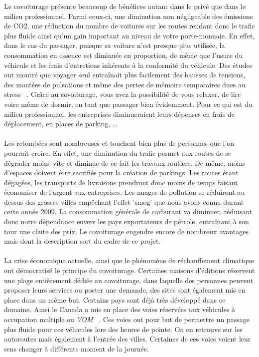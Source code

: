 \documentclass[12pt, a4paper, oneside]{article}
\begin{document}
    \indent Le covoiturage présente beaucoup de bénéfices autant dans le privé que dans le milieu professionnel. Parmi ceux-ci, une diminution non négligeable des émissions de CO2, une réduction du nombre de voitures sur les routes rendant donc le trafic plus fluide ainsi qu'un gain important au niveau de votre porte-monnaie. En effet, dans le cas du passager, puisque sa voiture n'est presque plus utilisée, la consommation en essence est diminuée en proportion, de même que l'usure du véhicule et les frais d'entretiens inhérents à la conformité du véhicule. Des études ont montré que voyager seul entraînait plus facilement des hausses de tensions, des montées de pulsations et même des pertes de mémoire temporaires dues au stress ~\cite{health-study}. Grâce au covoiturage, vous avez la possibilité de vous relaxer, de lire voire même de dormir, en tant que passager bien évidemment. Pour ce qui est du milieu professionnel, les entreprises diminueraient leurs dépenses en frais de déplacement, en places de parking, \dots\\\\
    \indent Les retombées sont nombreuses et touchent bien plus de personnes que l'on pourrait croire. En effet, une diminution du trafic permet aux routes de se dégrader moins vite et diminue de ce fait les travaux routiers. De même, moins d'espaces doivent être sacrifiés pour la création de parkings. Les routes étant dégagées, les transports de livraisons prendront donc moins de temps faisant économiser de l'argent aux entreprises. Les nuages de pollution se réduiront au dessus des grosses villes empêchant l'effet 'smog' que nous avons connu durant cette année 2009. La consommation générale de carburant va diminuer, réduisant donc notre dépendance envers les pays exportateurs de pétrole, entraînant à son tour une chute des prix. Le covoiturage engendre encore de nombreux avantages mais dont la description sort du cadre de ce projet.\\\\
    \indent La crise économique actuelle, ainsi que le phénomène de réchauffement climatique ont démocratisé le principe du covoiturage. Certaines maisons d'éditions réservent une plage entièrement dédiée au covoiturage, dans laquelle des personnes peuvent proposer leurs services ou poster une demande, des sites sont également mis en place dans un même but. Certains pays sont déjà très développé dans ce domaine. Ainsi le Canada a mis en place des voies réservées aux véhicules à occupation multiple ou \textit{VOM} ~\cite{article-VOM}. Ces voies ont pour but de permettre un passage plus fluide pour ces véhicules lors des heures de pointe. On en retrouve sur les autoroutes mais également à l'entrée des villes. Certaines de ces voies voient leur sens changer à différents moment de la journée.\\
\end{document}

